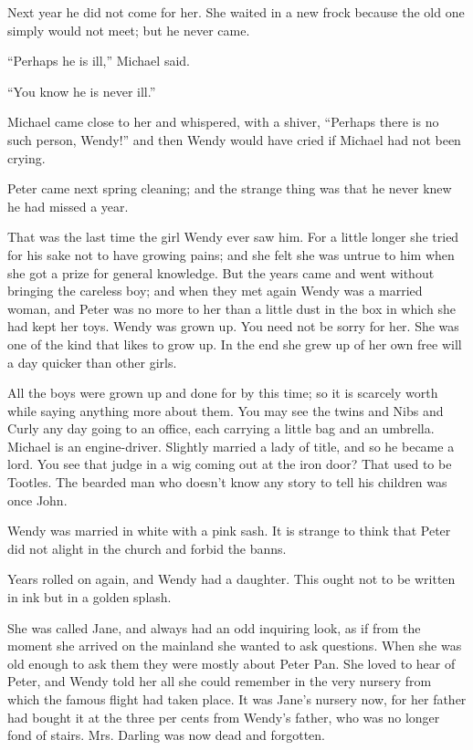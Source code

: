 Next year he did not come for her. She waited in a new frock because
the old one simply would not meet; but he never came.

``Perhaps he is ill,'' Michael said.

``You know he is never ill.''

Michael came close to her and whispered, with a shiver, ``Perhaps there
is no such person, Wendy!'' and then Wendy would have cried if Michael
had not been crying.

Peter came next spring cleaning; and the strange thing was that he
never knew he had missed a year.

That was the last time the girl Wendy ever saw him. For a little longer
she tried for his sake not to have growing pains; and she felt she was
untrue to him when she got a prize for general knowledge. But the years
came and went without bringing the careless boy; and when they met
again Wendy was a married woman, and Peter was no more to her than a
little dust in the box in which she had kept her toys. Wendy was grown
up. You need not be sorry for her. She was one of the kind that likes
to grow up. In the end she grew up of her own free will a day quicker
than other girls.

All the boys were grown up and done for by this time; so it is scarcely
worth while saying anything more about them. You may see the twins and
Nibs and Curly any day going to an office, each carrying a little bag
and an umbrella. Michael is an engine-driver. Slightly married a lady
of title, and so he became a lord. You see that judge in a wig coming
out at the iron door? That used to be Tootles. The bearded man who
doesn't know any story to tell his children was once John.

Wendy was married in white with a pink sash. It is strange to think
that Peter did not alight in the church and forbid the banns.

Years rolled on again, and Wendy had a daughter. This ought not to be
written in ink but in a golden splash.

She was called Jane, and always had an odd inquiring look, as if from
the moment she arrived on the mainland she wanted to ask questions.
When she was old enough to ask them they were mostly about Peter Pan.
She loved to hear of Peter, and Wendy told her all she could remember
in the very nursery from which the famous flight had taken place. It
was Jane's nursery now, for her father had bought it at the three per
cents from Wendy's father, who was no longer fond of stairs. Mrs.
Darling was now dead and forgotten.

